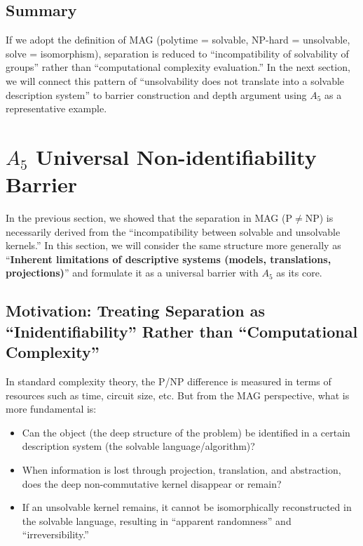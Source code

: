 \documentclass[11pt,a4paper]{article}
\theoremstyle{plain}
\theoremstyle{definition}
\newcommand{\Aalt}{A_5}
\begin{document}
\subsection{Summary}

If we adopt the definition of MAG (polytime = solvable, NP-hard = unsolvable, solve = isomorphism), separation is reduced to ``incompatibility of solvability of groups'' rather than ``computational complexity evaluation.'' In the next section, we will connect this pattern of ``unsolvability does not translate into a solvable description system'' to barrier construction and depth argument using $\Aalt$ as a representative example.

\section{$\Aalt$ Universal Non-identifiability Barrier}

In the previous section, we showed that the separation in MAG ($\mathrm{P} \neq \mathrm{NP}$) is necessarily derived from the ``incompatibility between solvable and unsolvable kernels.'' In this section, we will consider the same structure more generally as ``\textbf{Inherent limitations of descriptive systems (models, translations, projections)}'' and formulate it as a universal barrier with $\Aalt$ as its core.

\subsection{Motivation: Treating Separation as ``Inidentifiability'' Rather than ``Computational Complexity''}

In standard complexity theory, the P/NP difference is measured in terms of resources such as time, circuit size, etc. But from the MAG perspective, what is more fundamental is:
\begin{itemize}[nosep]
\item Can the object (the deep structure of the problem) be identified in a certain description system (the solvable language/algorithm)?
\item When information is lost through projection, translation, and abstraction, does the deep non-commutative kernel disappear or remain?
\item If an unsolvable kernel remains, it cannot be isomorphically reconstructed in the solvable language, resulting in ``apparent randomness'' and ``irreversibility.''
\end{itemize}
\end{document}
